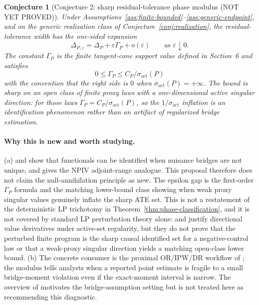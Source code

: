 \documentclass[11pt]{article}
\theoremstyle{definition}
\theoremstyle{plain}
\newtheorem{conjecture}{Conjecture}
\theoremstyle{remark}
\begin{document}
\begin{conjecture}[Conjecture 2: sharp residual-tolerance phase modulus (NOT YET PROVED)]\label{conj:residual-modulus}
Under Assumptions~\ref{ass:finite-bounded}--\ref{ass:generic-endpoint}, and
on the generic realization class of Conjecture~\ref{conj:realization}, the
residual-tolerance width has the one-sided expansion
\[
\Delta_{P,\varepsilon}
=\Delta_P+\varepsilon\Gamma_P+o(\varepsilon)
\qquad\text{as }\varepsilon\downarrow0.
\]
The constant \(\Gamma_P\) is the finite tangent-cone support value defined in
Section~6 and satisfies
\[
0\le\Gamma_P\le C_P/\sigma_{\mathrm{act}}(P)
\]
with the convention that the right side is \(0\) when
\(\sigma_{\mathrm{act}}(P)=+\infty\).  The bound is sharp on an open class of
finite proxy laws with a one-dimensional active singular direction: for those
laws \(\Gamma_P=C_P/\sigma_{\mathrm{act}}(P)\), so the
\(1/\sigma_{\mathrm{act}}\) inflation is an identification phenomenon rather
than an artifact of regularized bridge estimation.
\end{conjecture}
\paragraph{Why this is new and worth studying.}
(a) \citet{ZhangLiMiaoTchetgen2023SPL} and
\citet{BennettKallusMaoNeweySyrgkanisUehara2023COLT} show that functionals
can be identified when nuisance bridges are not unique, and
\citet{Santos2011JoE} gives the NPIV adjoint-range analogue.  This proposal
therefore does not claim the null-annihilation principle as new.  The epsilon
gap is the first-order \(\Gamma_P\) formula and the matching lower-bound
class showing when weak proxy singular values genuinely inflate the sharp ATE
set.  This is not a restatement of the deterministic LP trichotomy in
Theorem~\ref{thm:phase-classification}, and it is not covered by standard
LP perturbation theory alone: \citet{Fiacco1983Sensitivity} and
\citet{BonnansShapiro2000Perturbation} justify directional value derivatives
under active-set regularity, but they do not prove that the perturbed
finite program is the sharp causal identified set for a negative-control
law or that a weak-proxy singular direction yields a matching open-class
lower bound.  (b) The concrete consumer is the
proximal OR/IPW/DR workflow of \citet{CuiPuShiMiaoTchetgen2024JASA}; the
modulus tells analysts when a reported point estimate is fragile to a small
bridge-moment violation even if the exact-moment interval is narrow.  The
overview of \citet{TchetgenYingCuiShiMiao2024StatSci} motivates the
bridge-assumption setting but is not treated here as recommending this
diagnostic.
\end{document}

